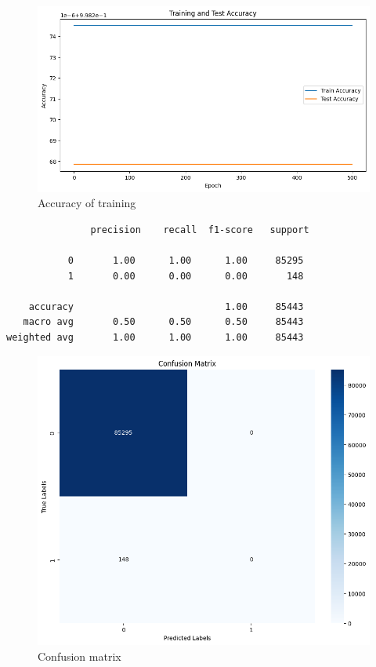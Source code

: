 \documentclass{article}
\begin{document}
\begin{figure}[H]
\centering
\includegraphics[width=1.0\linewidth]{img/C_A_2}
\caption{Accuracy of training}
\label{fig:ca2}
\end{figure}


\begin{LTR}

\begin{verbatim}
               precision    recall  f1-score   support

           0       1.00      1.00      1.00     85295
           1       0.00      0.00      0.00       148

    accuracy                           1.00     85443
   macro avg       0.50      0.50      0.50     85443
weighted avg       1.00      1.00      1.00     85443
\end{verbatim}
\end{LTR}

\begin{figure}[H]
\centering
\includegraphics[width=1.0\linewidth]{img/C_cm_2}
\caption{Confusion matrix}
\label{fig:ccm2}
\end{figure}
\end{document}
